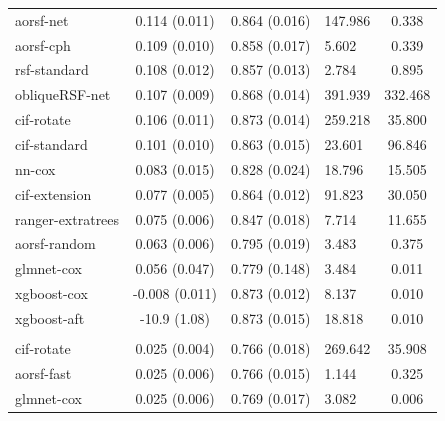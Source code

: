 \documentclass[twoside,11pt]{article}\usepackage[]{graphicx}\usepackage[]{xcolor}
\newenvironment{knitrout}{}{} %
\begin{document}
\begin{knitrout}
\begin{longtable}[t]{lcclc}
\hspace{1em}aorsf-net & 0.114 (0.011) & 0.864 (0.016) & 147.986 & 0.338\\
\hspace{1em}aorsf-cph & 0.109 (0.010) & 0.858 (0.017) & 5.602 & 0.339\\
\hspace{1em}rsf-standard & 0.108 (0.012) & 0.857 (0.013) & 2.784 & 0.895\\
\hspace{1em}obliqueRSF-net & 0.107 (0.009) & 0.868 (0.014) & 391.939 & 332.468\\
\hspace{1em}cif-rotate & 0.106 (0.011) & 0.873 (0.014) & 259.218 & 35.800\\
\hspace{1em}cif-standard & 0.101 (0.010) & 0.863 (0.015) & 23.601 & 96.846\\
\hspace{1em}nn-cox & 0.083 (0.015) & 0.828 (0.024) & 18.796 & 15.505\\
\hspace{1em}cif-extension & 0.077 (0.005) & 0.864 (0.012) & 91.823 & 30.050\\
\hspace{1em}ranger-extratrees & 0.075 (0.006) & 0.847 (0.018) & 7.714 & 11.655\\
\hspace{1em}aorsf-random & 0.063 (0.006) & 0.795 (0.019) & 3.483 & 0.375\\
\hspace{1em}glmnet-cox & 0.056 (0.047) & 0.779 (0.148) & 3.484 & 0.011\\
\hspace{1em}xgboost-cox & -0.008 (0.011) & 0.873 (0.012) & 8.137 & 0.010\\
\hspace{1em}xgboost-aft & -10.9 (1.08) & 0.873 (0.015) & 18.818 & 0.010\\
\addlinespace[0.3em]
\hline
\multicolumn{5}{l}{\textit{\textbf{MESA; stroke, n = 6783, p = 48}}}\\
\hline
\hspace{1em}cif-rotate & 0.025 (0.004) & 0.766 (0.018) & 269.642 & 35.908\\
\hspace{1em}aorsf-fast & 0.025 (0.006) & 0.766 (0.015) & 1.144 & 0.325\\
\hspace{1em}glmnet-cox & 0.025 (0.006) & 0.769 (0.017) & 3.082 & 0.006\\

\end{longtable}
\end{knitrout}
\end{document}
